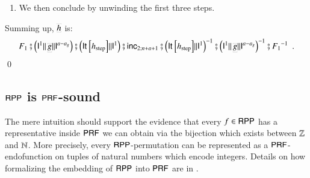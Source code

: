 \begin{prf}
\begin{itemize}[leftmargin=5mm]
\begin{enumerate}[leftmargin=5mm]
\item 
We then conclude by unwinding the first three steps.
\end{enumerate}
\end{itemize}
\par\noindent
Summing up, $\prrpr{h}$ is:
$$ F_1 \rprSeq \left(\rprPCom{\rprId^1}{\rprPCom{\prrpr{g}}{\rprId^{a-a_g}}}\right) \rprSeq \left(\rprPCom{\rprIt{}{}{h_{\text{step}}}}{\rprId^1}\right)
\rprSeq \rprInc_{2;n+a+1} \rprSeq \rprInv{\left(\rprPCom{\rprIt{}{}{h_{\text{step}}}}{\rprId^1}\right)} \rprSeq 
   \rprInv{\left(\rprPCom{\rprId^1}{\rprPCom{\prrpr{g}}{\rprId^{a-a_g}}}\right)}  \rprSeq \rprInv{F_1} 
\enspace . $$
\qed
\end{prf}

\subsection{$ \mathsf{RPP} $ is $ \mathsf{P}\mathsf{RF} $-sound}
The mere intuition should support the evidence that every $ f\in\mathsf{RPP} $ has a representative inside $ \mathsf{P}\mathsf{RF} $ we
can obtain via the bijection which exists between $ \mathbb{Z} $ and $ \mathbb{N} $. 
More precisely, every $ \mathsf{RPP} $-permutation can be represented  as a $ \mathsf{P}\mathsf{RF} $-endofunction on tuples of natural 
numbers which encode integers. Details on how formalizing the embedding of $ \mathsf{RPP} $ into $ \mathsf{P}\mathsf{RF} $ are in \cite{PaoliniPiccoloRoversiICTCS2015}.

